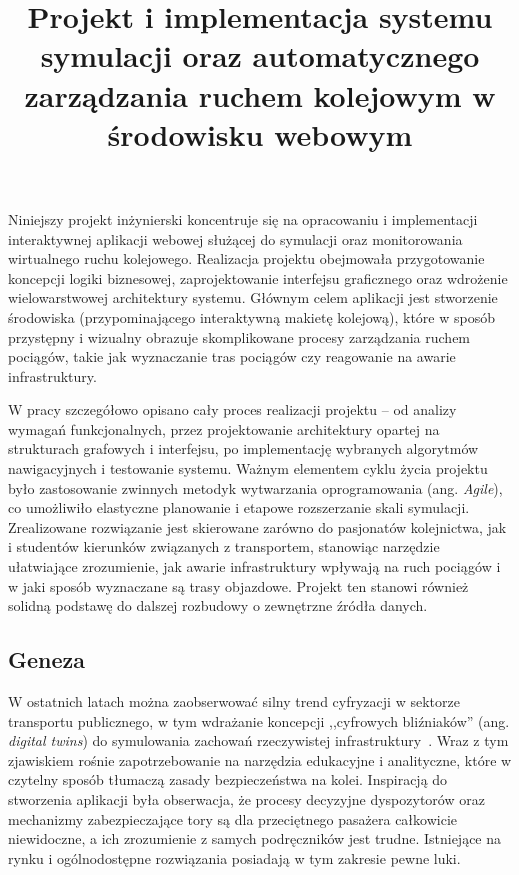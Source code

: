 \documentclass[twoside]{projektInzynierskiMS1z}
\title{Projekt i implementacja systemu symulacji oraz automatycznego
zarządzania ruchem kolejowym w środowisku webowym}
\begin{document}
\onehalfspacing


Niniejszy projekt inżynierski koncentruje się na opracowaniu i implementacji
interaktywnej aplikacji webowej służącej do symulacji oraz monitorowania
wirtualnego ruchu kolejowego. Realizacja projektu obejmowała przygotowanie
koncepcji logiki biznesowej, zaprojektowanie interfejsu graficznego oraz
wdrożenie wielowarstwowej architektury systemu. Głównym celem aplikacji jest
stworzenie środowiska (przypominającego interaktywną makietę kolejową), które
w sposób przystępny i wizualny obrazuje skomplikowane procesy zarządzania ruchem
pociągów, takie jak wyznaczanie tras pociągów czy reagowanie na awarie infrastruktury.

W pracy szczegółowo opisano cały proces realizacji projektu -- od analizy
wymagań funkcjonalnych, przez projektowanie architektury opartej na strukturach
grafowych i interfejsu, po implementację wybranych algorytmów nawigacyjnych
i testowanie systemu. Ważnym elementem cyklu życia projektu było zastosowanie
zwinnych metodyk wytwarzania oprogramowania (ang. \emph{Agile}), co umożliwiło
elastyczne planowanie i etapowe rozszerzanie skali symulacji. Zrealizowane
rozwiązanie jest skierowane zarówno do pasjonatów kolejnictwa, jak i studentów
kierunków związanych z transportem, stanowiąc narzędzie ułatwiające zrozumienie, jak awarie infrastruktury wpływają na ruch pociągów i w jaki sposób wyznaczane są trasy objazdowe. Projekt
ten stanowi również solidną podstawę do dalszej rozbudowy o zewnętrzne źródła
danych.

\subsection{Geneza}

W ostatnich latach można zaobserwować silny trend cyfryzacji w sektorze transportu
publicznego, w tym wdrażanie koncepcji ,,cyfrowych bliźniaków'' (ang. \emph{digital
twins}) do symulowania zachowań rzeczywistej infrastruktury~\cite{digitaltwin}.
Wraz z tym zjawiskiem rośnie zapotrzebowanie na narzędzia edukacyjne i analityczne,
które w czytelny sposób tłumaczą zasady bezpieczeństwa na kolei. Inspiracją do
stworzenia aplikacji była obserwacja, że procesy decyzyjne dyspozytorów oraz
mechanizmy zabezpieczające tory są dla przeciętnego pasażera całkowicie niewidoczne,
a ich zrozumienie z samych podręczników jest trudne. Istniejące na rynku
i ogólnodostępne rozwiązania posiadają w tym zakresie pewne luki.
\end{document}
